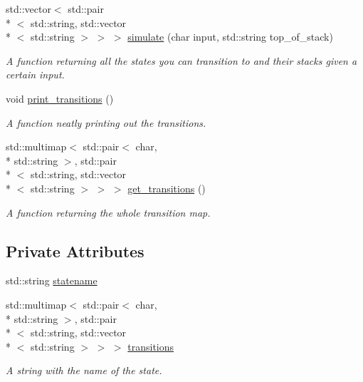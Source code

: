 \begin{DoxyCompactItemize}
std\-::vector$<$ std\-::pair\\*
$<$ std\-::string, std\-::vector\\*
$<$ std\-::string $>$ $>$ $>$ \hyperlink{classPDA_1_1State_af5d878651060daa40b2259531d1df111}{simulate} (char input, std\-::string top\-\_\-of\-\_\-stack)
\begin{DoxyCompactList}\small\item\em A function returning all the states you can transition to and their stacks given a certain input. \end{DoxyCompactList}\item 
void \hyperlink{classPDA_1_1State_afd437b030a253440225b75695f8ccf90}{print\-\_\-transitions} ()
\begin{DoxyCompactList}\small\item\em A function neatly printing out the transitions. \end{DoxyCompactList}\item 
std\-::multimap$<$ std\-::pair$<$ char, \\*
std\-::string $>$, std\-::pair\\*
$<$ std\-::string, std\-::vector\\*
$<$ std\-::string $>$ $>$ $>$ \hyperlink{classPDA_1_1State_af55439fad25308b084feb62eeaf3b7a2}{get\-\_\-transitions} ()
\begin{DoxyCompactList}\small\item\em A function returning the whole transition map. \end{DoxyCompactList}\end{DoxyCompactItemize}
\subsection*{Private Attributes}
\begin{DoxyCompactItemize}
\item 
std\-::string \hyperlink{classPDA_1_1State_afbfeb988281f28afbb9a0718e8e4eb67}{statename}
\item 
std\-::multimap$<$ std\-::pair$<$ char, \\*
std\-::string $>$, std\-::pair\\*
$<$ std\-::string, std\-::vector\\*
$<$ std\-::string $>$ $>$ $>$ \hyperlink{classPDA_1_1State_abbe5635de165a5a202ba1eb31ee61af1}{transitions}
\begin{DoxyCompactList}\small\item\em A string with the name of the state. \end{DoxyCompactList}\end{DoxyCompactItemize}


